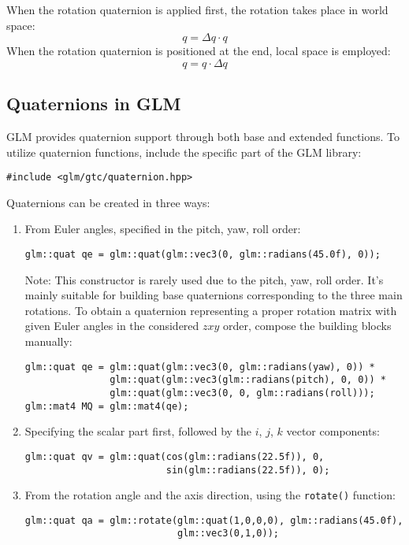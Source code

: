 When the rotation quaternion is applied first, the rotation takes place in world space:
\[q=\Delta q \cdot q\]
When the rotation quaternion is positioned at the end, local space is employed: 
\[q=q \cdot\Delta q\]

\subsection{Quaternions in GLM}
GLM provides quaternion support through both base and extended functions. 
To utilize quaternion functions, include the specific part of the GLM library:
\begin{verbatim}
#include <glm/gtc/quaternion.hpp>    
\end{verbatim}
Quaternions can be created in three ways:
\begin{enumerate}
    \item From Euler angles, specified in the pitch, yaw, roll order:
        \begin{verbatim}
glm::quat qe = glm::quat(glm::vec3(0, glm::radians(45.0f), 0));
        \end{verbatim}
        Note: This constructor is rarely used due to the pitch, yaw, roll order. 
        It's mainly suitable for building base quaternions corresponding to the three main rotations. 
        To obtain a quaternion representing a proper rotation matrix with given Euler angles in the considered $zxy$ order, compose the building blocks manually:
        \begin{verbatim}
glm::quat qe = glm::quat(glm::vec3(0, glm::radians(yaw), 0)) *
               glm::quat(glm::vec3(glm::radians(pitch), 0, 0)) *
               glm::quat(glm::vec3(0, 0, glm::radians(roll)));
glm::mat4 MQ = glm::mat4(qe);
        \end{verbatim}
    \item Specifying the scalar part first, followed by the $i$, $j$, $k$ vector components:
        \begin{verbatim}
glm::quat qv = glm::quat(cos(glm::radians(22.5f)), 0, 
                         sin(glm::radians(22.5f)), 0);
        \end{verbatim}
    \item From the rotation angle and the axis direction, using the \texttt{rotate()} function: 
        \begin{verbatim}
glm::quat qa = glm::rotate(glm::quat(1,0,0,0), glm::radians(45.0f), 
                           glm::vec3(0,1,0));
        \end{verbatim}
\end{enumerate}
